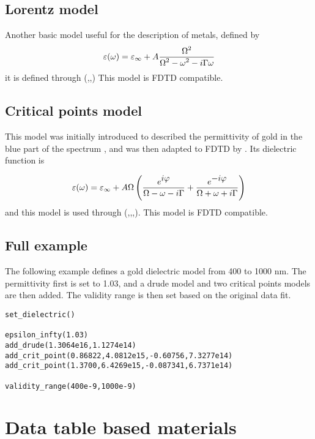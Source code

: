 \subsection{Lorentz model}

Another basic model useful for the description of metals, defined by
\begin{equation}
\varepsilon(\omega)=\varepsilon_\infty+A\frac{\displaystyle \Omega^2}{\displaystyle \Omega^2-\omega^2-i\Gamma\omega}
\end{equation}
it is defined through (,\lft{$\Omega$},\lft{$\Gamma$}) This model is FDTD compatible.

\subsection{Critical points model}

This model was initially introduced to described the permittivity of gold in the blue part of the spectrum \cite{Etchegoin:06}, and was then adapted to FDTD by \cite{Vial:07}. Its dielectric function is
	
\begin{equation}
\varepsilon(\omega)=\varepsilon_\infty+A\Omega\left(\frac{\displaystyle e^{\displaystyle i\varphi}}{\displaystyle \Omega-\omega-i\Gamma}+\frac{\displaystyle e^{\displaystyle -i\varphi}}{\displaystyle \Omega+\omega+i\Gamma}\right)
\end{equation}
and this model is used through (,\lft{$\Omega$},\lft{$\varphi$},\lft{$\Gamma$}). This model is FDTD compatible.

\subsection{Full example}

The following example defines a gold dielectric model from 400 to 1000 nm. The permittivity first is set to 1.03, and a drude model and two critical points models are then added. The validity range is then set based on the original data fit.

\begin{lstlisting}
set_dielectric()

epsilon_infty(1.03)
add_drude(1.3064e16,1.1274e14)
add_crit_point(0.86822,4.0812e15,-0.60756,7.3277e14)
add_crit_point(1.3700,6.4269e15,-0.087341,6.7371e14)

validity_range(400e-9,1000e-9)
\end{lstlisting}

\section{Data table based materials}


